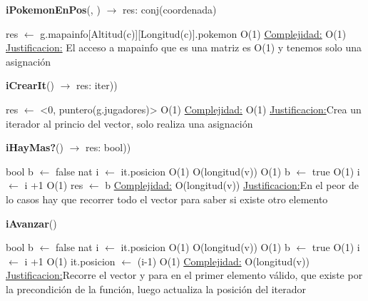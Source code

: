 \begin{Algoritmos}
\begin{algorithm}[H]{\textbf{iPokemonEnPos}(, ) $\to$ res: conj(coordenada)}
	\begin{algorithmic}[1]
		\State res $\gets$ g.mapainfo[Altitud(c)][Longitud(c)].pokemon \Comment O(1)
		\medskip
		\Statex \underline{Complejidad:} O(1)
		\Statex \underline{Justificacion:} El acceso a mapainfo que es una matriz es O(1) y tenemos solo una asignaci\'on
	\end{algorithmic}
\end{algorithm}








\begin{algorithm}[H]{\textbf{iCrearIt}() $\to$ res: iter))}
	\begin{algorithmic}[1]
		\State res $\gets$ <0, puntero(g.jugadores)> \Comment O(1)
		\medskip
		\Statex \underline{Complejidad:} O(1)
		\Statex \underline{Justificacion:}Crea un iterador al princio del vector, solo 
		realiza una asignación  
	\end{algorithmic}
\end{algorithm}

\begin{algorithm}[H]{\textbf{iHayMas?}() $\to$ res: bool))}
	\begin{algorithmic}[1]
		\State bool b $\gets$ false
		\State nat i $\gets$ it.posicion \Comment O(1)
		 \Comment O(longitud(v))
			 \Comment O(1)
				\State b $\gets$ true \Comment O(1)
			\EndIf
		\State i $\gets$ i +1 \Comment O(1)		
		\EndWhile
		\State res $\gets$ b
		\medskip
		\Statex \underline{Complejidad:} O(longitud(v))
		\Statex \underline{Justificacion:}En el peor de lo casos hay que recorrer todo el vector para saber si existe otro elemento

\end{algorithmic}
\end{algorithm}	
		
\begin{algorithm}[H]{\textbf{iAvanzar}()}
	\begin{algorithmic}[1]
		\State bool b $\gets$ false
		\State nat i $\gets$ it.posicion \Comment O(1)
		 \Comment O(longitud(v))
			 \Comment O(1)
				\State b $\gets$ true \Comment O(1)
			\EndIf
		\State i $\gets$ i +1 \Comment O(1)		
		\EndWhile
		\State it.posicion $\gets$ (i-1) \Comment O(1)
		\medskip
		\Statex \underline{Complejidad:} O(longitud(v))
		\Statex \underline{Justificacion:}Recorre el vector y para en el primer elemento válido, que existe por la precondición de la función, luego actualiza la posición del iterador  
	\end{algorithmic}
\end{algorithm}


\end{Algoritmos}
